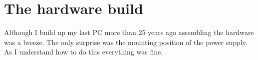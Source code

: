 \section{The hardware build}

Although I build up my last PC more than 25 years ago assembling the
hardware was a breeze. The only surprise was the mounting position of the
power supply. As I understand how to do this everything was fine.
